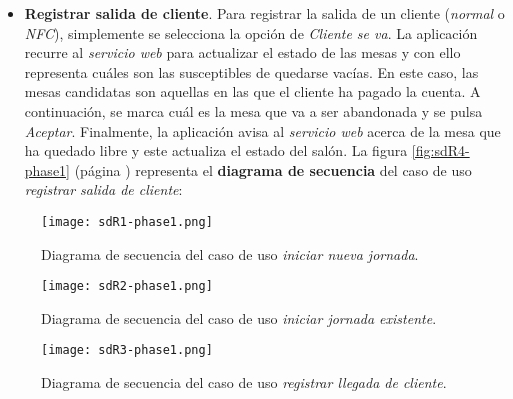 \begin{itemize}
\item \textbf{Registrar salida de cliente}. Para registrar la salida de un
cliente (\emph{normal} o \emph{\acs{NFC}}), simplemente se selecciona la
opción de \emph{Cliente se va}. La aplicación recurre al \emph{servicio web}
para actualizar el estado de las mesas y con ello representa cuáles son las
susceptibles de quedarse vacías. En este caso, las mesas candidatas son
aquellas en las que el cliente ha pagado la cuenta. A continuación, se marca
cuál es la mesa que va a ser abandonada y se pulsa \emph{Aceptar}. Finalmente,
la aplicación avisa al \emph{servicio web} acerca de la mesa que ha quedado
libre y este actualiza el estado del salón. La figura \ref{fig:sdR4-phase1}
(página \pageref{fig:sdR4-phase1}) representa el \textbf{diagrama de secuencia}
del caso de uso \emph{registrar salida de cliente}:

\end{itemize}


  \begin{sidewaysfigure}[!h]
    \begin{center}
      \texttt{[image: sdR1-phase1.png]}
      \caption{Diagrama de secuencia del caso de uso \emph{iniciar nueva
      jornada}.}
      \label{fig:sdR1-phase1}
    \end{center}
  \end{sidewaysfigure}

  \begin{sidewaysfigure}[!h]
    \begin{center}
      \texttt{[image: sdR2-phase1.png]}
      \caption{Diagrama de secuencia del caso de uso \emph{iniciar jornada
      existente}.}
      \label{fig:sdR2-phase1}
    \end{center}
  \end{sidewaysfigure}

  \begin{sidewaysfigure}[!h]
    \begin{center}
      \texttt{[image: sdR3-phase1.png]}
      \caption{Diagrama de secuencia del caso de uso \emph{registrar llegada
      de cliente}.}
      \label{fig:sdR3-phase1}
    \end{center}
  \end{sidewaysfigure}

